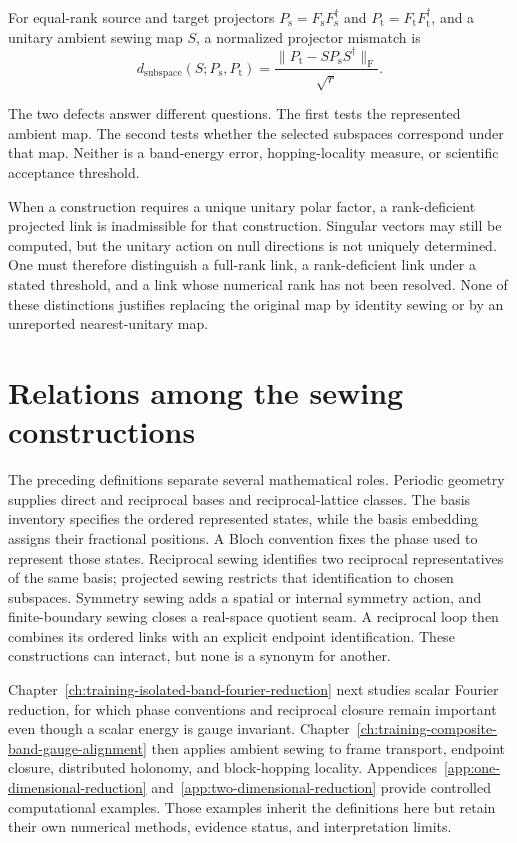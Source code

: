 \begin{definition}
\label{def:training-sewn-subspace-mismatch}
For equal-rank source and target projectors
\(P_{\mathrm s}=F_{\mathrm s}F_{\mathrm s}^{\dagger}\) and
\(P_{\mathrm t}=F_{\mathrm t}F_{\mathrm t}^{\dagger}\), and a unitary ambient
sewing map \(S\), a normalized projector mismatch is
\begin{equation}
  d_{\mathrm{subspace}}(S;P_{\mathrm s},P_{\mathrm t})
  =\frac{\lVert P_{\mathrm t}-SP_{\mathrm s}S^{\dagger}\rVert_{\mathrm F}}
  {\sqrt r}.
  \label{eq:training-sewn-subspace-mismatch}
\end{equation}
\end{definition}

The two defects answer different questions. The first tests the represented
ambient map. The second tests whether the selected subspaces correspond under
that map. Neither is a band-energy error, hopping-locality measure, or
scientific acceptance threshold.

When a construction requires a unique unitary polar factor, a rank-deficient
projected link is inadmissible for that construction. Singular vectors may still
be computed, but the unitary action on null directions is not uniquely
determined. One must therefore distinguish a full-rank link, a rank-deficient
link under a stated threshold, and a link whose numerical rank has not been
resolved. None of these distinctions justifies replacing the original map by
identity sewing or by an unreported nearest-unitary map.

\section{Relations among the sewing constructions}

The preceding definitions separate several mathematical roles. Periodic
geometry supplies direct and reciprocal bases and reciprocal-lattice classes.
The basis inventory specifies the ordered represented states, while the basis
embedding assigns their fractional positions. A Bloch convention fixes the
phase used to represent those states. Reciprocal sewing identifies two
reciprocal representatives of the same basis; projected sewing restricts that
identification to chosen subspaces. Symmetry sewing adds a spatial or internal
symmetry action, and finite-boundary sewing closes a real-space quotient seam.
A reciprocal loop then combines its ordered links with an explicit endpoint
identification. These constructions can interact, but none is a synonym for
another.

Chapter~\ref{ch:training-isolated-band-fourier-reduction} next studies scalar
Fourier reduction, for which phase conventions and reciprocal closure remain
important even though a scalar energy is gauge invariant. Chapter~\ref{ch:training-composite-band-gauge-alignment}
then applies ambient sewing to frame transport, endpoint closure, distributed
holonomy, and block-hopping locality. Appendices~\ref{app:one-dimensional-reduction}
and~\ref{app:two-dimensional-reduction} provide controlled computational
examples. Those examples inherit the definitions here but retain their own
numerical methods, evidence status, and interpretation limits.
